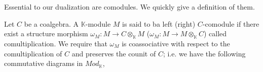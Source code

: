 \documentclass[../thesis.tex]{subfiles}
\begin{document}
            Essential to our dualization are comodules. We quickly give a definition of them.

            \begin{definition}[Comodules]
                Let $C$ be a coalgebra. A $\mathbb{K}$-module $M$ is said to ba left (right) $C$-comodule if there exist a structure morphism $\omega_M: M \rightarrow C\otimes_{\mathbb{K}}M$ ($\omega_M: M \rightarrow M\otimes_{\mathbb{K}}C$) called comultiplication. We require that $\omega_M$ is coassociative with respect to the comultiplication of $C$ and preserves the counit of $C$; i.e. we have the following commutative diagrams in $Mod_\mathbb{K}$,
                \begin{center}
                \end{center}
                

    
    

\end{definition}
\end{document}
